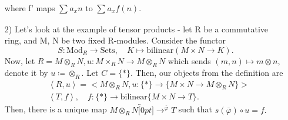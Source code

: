 \documentclass[../category_theory.tex]{subfiles}
\begin{document}
\begin{example}
\begin{itemize}
\begin{center}
\begin{tikzpicture}
			      \end{tikzpicture}
		      \end{center}
		      where f' maps \(\sum\limits_{}^{}a_{x}n\) to \(\sum\limits_{}^{}a_{x}f(n)\).
		\item[2)] Let's look at the example of tensor products - let R be a commutative ring, and M, N be two fixed R-modules. Consider the functor
		      \[
			      S:\mathrm{Mod}_{R}\rightarrow \mathrm{Sets},\quad K\mapsto \text{bilinear}(M\times N\rightarrow K).
		      \]
		      Now, let \(R=M\otimes_{R}N, u:M\times_{R} N\rightarrow M\otimes_{R} N\) which sends \((m, n)\mapsto m\otimes n\), denote it by \(u\coloneqq \otimes_{R} \).
		      Let \(C=\{*\}\). Then, our objects from the definition are
		      \begin{align*}
			       & \left< R, u \right>=\biggl< M\otimes_{R} N, u:\{*\}\rightarrow  \{M\times N\rightarrow M\otimes_{R} N\}\biggr> \\
			       & \left< T, f \right>,\quad f:\{*\}\rightarrow \text{bilinear}\{M\times N\rightarrow T\}.
		      \end{align*}
		      Then, there is a unique map \(M\otimes_{R}N\overbracket[0pt]{\longrightarrow}^{\overline{\varphi }} T\) such that \(s(\overline{\varphi })\circ u=f.\)

\end{itemize}
\end{example}
\end{document}
